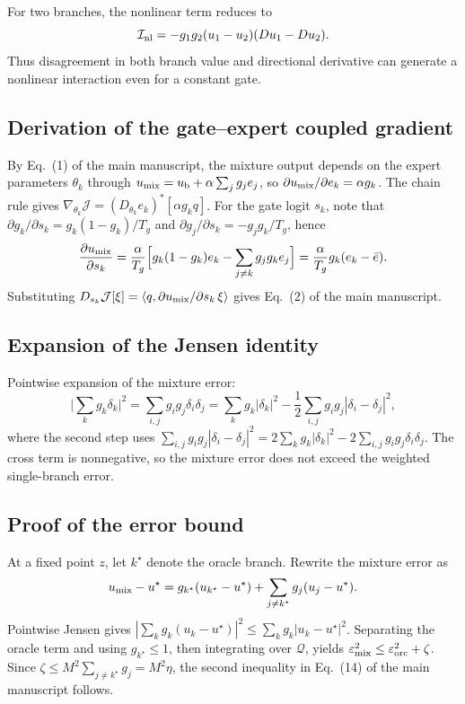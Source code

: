 \documentclass[preprint,12pt]{elsarticle}
\begin{document}
For two branches, the nonlinear term reduces to
\begin{equation}
\mathcal I_{\rm nl}
=-g_1g_2(u_1-u_2)(Du_1-Du_2).
\label{eq:two_branch_covariance}
\end{equation}
Thus disagreement in both branch value and directional derivative can generate
a nonlinear interaction even for a constant gate.

\subsection{Derivation of the gate--expert coupled gradient}

By Eq.~(1) of the main manuscript, the mixture output depends on the expert parameters $\theta_k$ through
$u_{\rm mix}=u_{\rm b}+\alpha\sum_j g_je_j$, so $\partial u_{\rm mix}/\partial e_k=\alpha g_k$.
The chain rule gives $\nabla_{\theta_k}\mathcal J=(D_{\theta_k}e_k)^*[\alpha g_kq]$.
For the gate logit $s_k$, note that
$\partial g_k/\partial s_k=g_k(1-g_k)/T_g$ and $\partial g_j/\partial s_k=-g_jg_k/T_g$,
hence
\begin{equation}
\frac{\partial u_{\rm mix}}{\partial s_k}
=\frac{\alpha}{T_g}\Big[g_k(1-g_k)e_k-\sum_{j\ne k}g_jg_ke_j\Big]
=\frac{\alpha}{T_g}g_k(e_k-\bar e).
\end{equation}
Substituting $D_{s_k}\mathcal J[\xi]=\langle q,\partial u_{\rm mix}/\partial s_k\,\xi\rangle$ gives Eq.~(2) of the main manuscript.

\subsection{Expansion of the Jensen identity}

Pointwise expansion of the mixture error:
\begin{equation}
\Big|\sum_k g_k\delta_k\Big|^2
=\sum_{i,j}g_ig_j\delta_i\delta_j
=\sum_k g_k|\delta_k|^2
-\frac12\sum_{i,j}g_ig_j|\delta_i-\delta_j|^2,
\end{equation}
where the second step uses
$\sum_{i,j}g_ig_j|\delta_i-\delta_j|^2
=2\sum_k g_k|\delta_k|^2-2\sum_{i,j}g_ig_j\delta_i\delta_j$.
The cross term is nonnegative, so the mixture error does not exceed the weighted single-branch error.

\subsection{Proof of the error bound}

At a fixed point $z$, let $k^\star$ denote the oracle branch. Rewrite the mixture error as
\begin{equation}
u_{\rm mix}-u^\star
=g_{k^\star}(u_{k^\star}-u^\star)+\sum_{j\ne k^\star}g_j(u_j-u^\star).
\end{equation}
Pointwise Jensen gives
$|\sum_kg_k(u_k-u^\star)|^2\le\sum_kg_k|u_k-u^\star|^2$.
Separating the oracle term and using $g_{k^\star}\le1$, then integrating over $\mathcal Q$, yields
$\varepsilon_{\rm mix}^2\le\varepsilon_{\rm orc}^2+\zeta$.
Since $\zeta\le M^2\sum_{j\ne k^\star}g_j=M^2\eta$, the second inequality in Eq.~(14) of the main manuscript follows.
\end{document}
